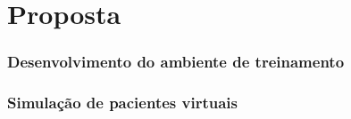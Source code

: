 \chapter{Proposta} \label{cap:cap4}

\subsection {Desenvolvimento do ambiente de treinamento} 

\subsection {Simulação de pacientes virtuais}
